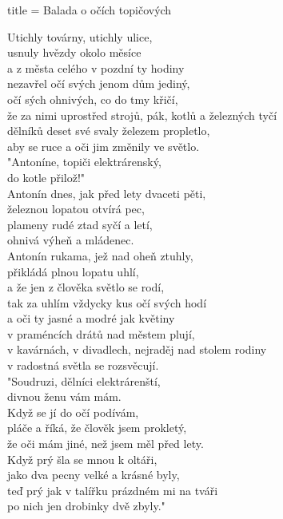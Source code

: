 \begin{song}{title = {Balada o očích topičových}}

Utichly továrny, utichly ulice, \\
usnuly hvězdy okolo měsíce \\
a z města celého v pozdní ty hodiny \\
nezavřel očí svých jenom dům jediný, \\
očí sých ohnivých, co do tmy křičí, \\
že za nimi uprostřed strojů, pák, kotlů a železných tyčí \\
dělníků deset své svaly železem propletlo, \\
aby se ruce a oči jim změnily ve světlo. \\

"Antoníne, topiči elektrárenský, \\
do kotle přilož!" \\

Antonín dnes, jak před lety dvaceti pěti, \\
železnou lopatou otvírá pec, \\ 
plameny rudé ztad syčí a letí, \\
ohnivá výheň a mládenec. \\
Antonín rukama, jež nad oheň ztuhly, \\
přikládá plnou lopatu uhlí, \\
a že jen z člověka světlo se rodí, \\
tak za uhlím vždycky kus očí svých hodí \\
a oči ty jasné a modré jak květiny \\
v praméncích drátů nad městem plují, \\
v kavárnách, v divadlech, nejraděj nad stolem rodiny \\
v radostná světla se rozsvěcují. \\

"Soudruzi, dělníci elektrárenští, \\
divnou ženu vám mám. \\
Když se jí do očí podívám, \\
pláče a říká, že člověk jsem prokletý, \\
že oči mám jiné, než jsem měl před lety. \\
Když prý šla se mnou k oltáři, \\
jako dva pecny velké a krásné byly, \\
teď prý jak v talířku prázdném mi na tváři \\
po nich jen drobinky dvě zbyly." \\


\end{song}
